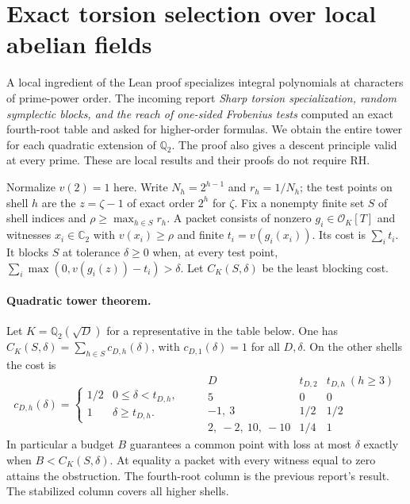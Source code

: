 \section{Exact torsion selection over local abelian fields}
\label{sec:quadratic-tower}
A local ingredient of the Lean proof specializes integral polynomials at
characters of prime-power order. The incoming report
\emph{Sharp torsion specialization, random symplectic blocks, and the reach
of one-sided Frobenius tests} computed an exact fourth-root table and asked for
higher-order formulas. We obtain the entire tower for each quadratic
extension of $\mathbb Q_2$. The proof also gives a descent principle valid
at every prime. These are local results and their proofs do not require RH.

Normalize $v(2)=1$ here. Write $N_h=2^{h-1}$ and $r_h=1/N_h$;
the test points on shell $h$ are the $z=\zeta-1$ of exact order
$2^h$ for $\zeta$. Fix a nonempty finite set $S$ of shell indices and
$\rho\ge\max_{h\in S}r_h$. A packet consists of nonzero
$g_i\in\mathcal O_K[T]$ and witnesses $x_i\in\mathbb C_2$ with
$v(x_i)\ge\rho$ and finite $t_i=v(g_i(x_i))$. Its cost is $\sum_i t_i$.
It blocks $S$ at tolerance $\delta\ge0$ when, at every test point,
$\sum_i\max(0,v(g_i(z))-t_i)>\delta$.
Let $C_K(S,\delta)$ be the least blocking cost.

\paragraph{Quadratic tower theorem.}
Let $K=\mathbb Q_2(\sqrt D)$ for a representative in the table below.
One has $C_K(S,\delta)=\sum_{h\in S}c_{D,h}(\delta)$, with
$c_{D,1}(\delta)=1$ for all $D,\delta$. On the other shells the cost is
\[
 c_{D,h}(\delta)=
 \begin{cases}1/2&0\le\delta<t_{D,h},\\1&\delta\ge t_{D,h}.
 \end{cases}
\qquad
\begin{array}{c|cc}
D&t_{D,2}&t_{D,h}\ (h\ge3)\\\hline
5&0&0\\
-1,\ 3&1/2&1/2\\
2,\ -2,\ 10,\ -10&1/4&1
\end{array}
\]
In particular a budget $B$ guarantees a common point with loss at most
$\delta$ exactly when $B<C_K(S,\delta)$. At equality a packet with every
witness equal to zero attains the obstruction. The fourth-root column is
the previous report's result. The stabilized column covers all higher shells.

